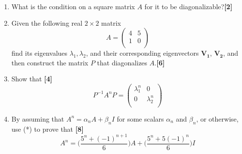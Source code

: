 \documentclass[a4paper]{article}
\begin{document}
\newpage
\begin{qns}\leavevmode
\begin{enumerate}[label=(\alph*)]
\item  What is the condition on a square matrix $A$ for it to be diagonalizable?\hfill \textbf{[2]}
\item Given the following real $2\times 2$ matrix
$$A=\begin{pmatrix}4&5\\1&0\\\end{pmatrix}$$
find its eigenvalues $\lambda_1,\lambda_2$, and their corresponding eigenvectors $\mathbf{V_1}$, $\mathbf{V_2}$, and then construct the matrix $P$ that diagonalizes $A$.\hfill \textbf{[6]}
\item Show that \hfill \textbf{[4]}
\begin{equation}
  P^{-1}A^nP=\begin{pmatrix}\lambda_1^n&0\\0&\lambda_2^n\\\end{pmatrix}\tag{*}
\end{equation}
\item By assuming that  $A^n=\alpha_nA+\beta_nI$ for some scalars $\alpha_n$ and $\beta_n$, or otherwise, use (*) to prove that \hfill \textbf{[8]}
$$A^n=\bigg(\frac{5^n+(-1)^{n+1}}{6}\bigg)A+\bigg(\frac{5^n+5(-1)^n}{6}\bigg)I$$
\end{enumerate}
\end{qns}
\end{document}
